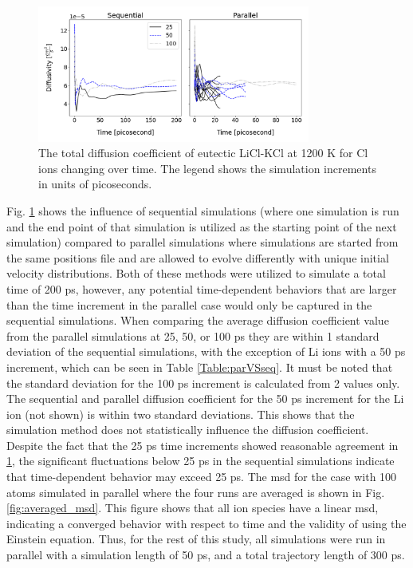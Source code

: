 \documentclass[review]{elsarticle}
\providecommand{\DIFaddtex}[1]{{\protect\color{blue} \sf #1}} %
\providecommand{\DIFaddbegin}{} %
\providecommand{\DIFaddend}{} %
\providecommand{\DIFadd}[1]{\texorpdfstring{\DIFaddtex{#1}}{#1}} %
\newcommand{\DIFaddincludegraphics}[2][]{{\color{blue}\fbox{\DIFOincludegraphics[#1]{#2}}}} %
\DeclareRobustCommand{\DIFaddbegin}{\DIFOaddbegin \let\includegraphics\DIFaddincludegraphics} %
\DeclareRobustCommand{\DIFaddend}{\DIFOaddend \let\includegraphics\DIFOincludegraphics} %
\begin{document}
\begin{figure}[h!]
 \centering
 \includegraphics[width=0.8\textwidth]{SeqVsPar_Cl.png} 
 \caption{The total diffusion coefficient of eutectic LiCl-KCl at 1200 K for Cl ions changing over time. The legend shows the simulation increments in units of picoseconds.}
 \label{fig:SeqVsPar}
\end{figure} 

Fig. \ref{fig:SeqVsPar} shows the influence of sequential simulations (where one simulation is run and the end point of that simulation is utilized as the starting point of the next simulation) compared to parallel simulations where simulations are started from the same positions file and are allowed to evolve differently \DIFaddbegin \DIFadd{with unique initial velocity distributions}\DIFaddend . Both of these methods were utilized to simulate a total time of 200 ps, however, any potential time-dependent behaviors that are larger than the time increment in the parallel case would only be captured in the sequential simulations. When comparing the average diffusion coefficient value from the parallel simulations at 25, 50, or 100 ps they are within 1 standard deviation of the sequential simulations, with the exception of Li ions with a 50 ps increment, which can be seen in Table \ref{Table:parVSseq}. It must be noted that the standard deviation for the 100 ps increment is calculated from 2 values only. The sequential and parallel diffusion coefficient for the 50 ps increment for the Li ion (not shown) is within two standard deviations. This shows that the simulation method does not statistically influence the diffusion coefficient. Despite the fact that the 25 ps time increments showed reasonable agreement in \cref{fig:SeqVsPar}, the significant fluctuations below 25 ps in the sequential simulations indicate that time-dependent behavior may exceed 25 ps. The msd for the case with 100 atoms simulated in parallel where the four runs are averaged is shown in Fig. \ref{fig:averaged_msd}. This figure shows that all ion species have a linear msd, indicating a converged behavior with respect to time and the validity of using the Einstein equation. Thus, for the rest of this study, all simulations were run in parallel with a simulation length of 50 ps, and a total trajectory length of 300 ps.
\end{document}
